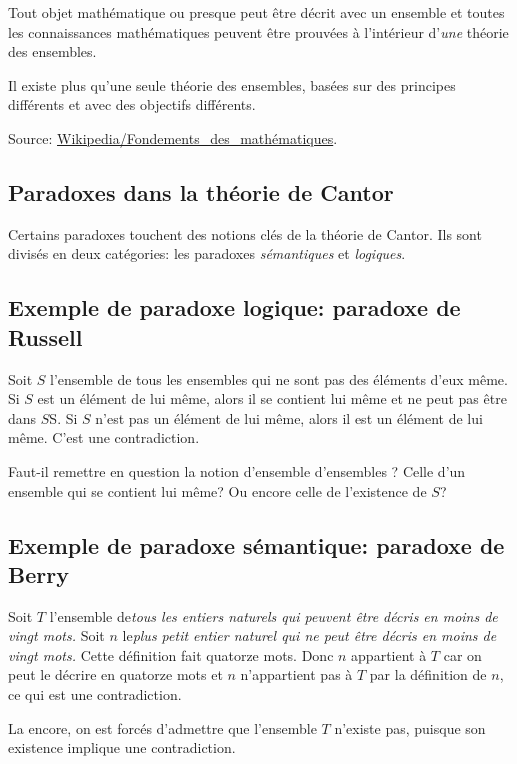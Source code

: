 \documentclass[fleqn,a4paper,nobib]{tufte-handout}
\begin{document}
Tout objet mathématique ou presque peut être décrit avec un ensemble et
toutes les connaissances mathématiques peuvent être prouvées à l'intérieur
d'\textit{une} théorie des ensembles.

Il existe plus qu'une seule théorie des ensembles, basées sur
des principes différents et avec des objectifs différents.

Source: \href{https://fr.wikipedia.org/wiki/Fondements_des_math%C3%A9matiques}{Wikipedia/Fondements\_des\_mathématiques}.

\subsection{Paradoxes dans la théorie de Cantor}

Certains paradoxes touchent des notions clés de la théorie de Cantor.
Ils sont divisés en deux catégories: les paradoxes \textit{sémantiques}
et \textit{logiques}.

\subsection*{Exemple de paradoxe logique: paradoxe de Russell}

Soit $S$ l'ensemble de tous les ensembles qui ne sont pas des éléments
d'eux même. Si $S$ est un élément de lui même, alors il se contient lui
même et ne peut pas être dans \(S\)S. Si $S$ n'est pas un élément de lui même,
alors il est un élément de lui même. C'est une contradiction.

Faut-il remettre en question la notion d'ensemble d'ensembles ?
Celle d'un ensemble qui se contient lui même? Ou encore celle
de l'existence de $S$?

\subsection*{Exemple de paradoxe sémantique: paradoxe de Berry}

Soit $T$ l'ensemble de\textit{tous les entiers naturels qui peuvent
être décris en moins de vingt mots.} Soit $n$
le\textit{plus petit entier naturel qui ne peut être décris en moins de vingt mots.}
Cette définition fait quatorze mots. Donc $n$ appartient à $T$ car on peut le décrire
en quatorze mots et $n$ n'appartient pas à $T$ par la définition de $n$, ce qui est
une contradiction.

La encore, on est forcés d'admettre que l'ensemble $T$ n'existe pas,
puisque son existence implique une contradiction.
\end{document}
